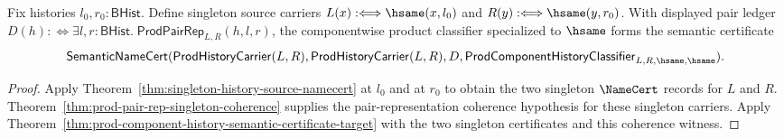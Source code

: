 \begin{theorem}
\label{thm:prod-singleton-componentwise-semantic-certificate}
Fix histories $l_0,r_0:\mathsf{BHist}$. Define singleton source carriers
$L(x):\Longleftrightarrow\hsame(x,l_0)$ and
$R(y):\Longleftrightarrow\hsame(y,r_0)$. With displayed pair ledger
$D(h):\Longleftrightarrow
\exists l,r:\mathsf{BHist}.\;\mathsf{ProdPairRep}_{L,R}(h,l,r)$, the
componentwise product classifier specialized to $\hsame$ forms the semantic
certificate
$$
\mathsf{SemanticNameCert}(\mathsf{ProdHistoryCarrier}(L,R),
\mathsf{ProdHistoryCarrier}(L,R),
D,
\mathsf{ProdComponentHistoryClassifier}_{L,R,\hsame,\hsame}).
$$
\end{theorem}
\begin{proof}
Apply Theorem~\ref{thm:singleton-history-source-namecert} at $l_0$ and at
$r_0$ to obtain the two singleton $\NameCert$ records for $L$ and $R$.
Theorem~\ref{thm:prod-pair-rep-singleton-coherence} supplies the
pair-representation coherence hypothesis for these singleton carriers. Apply
Theorem~\ref{thm:prod-component-history-semantic-certificate-target} with the
two singleton certificates and this coherence witness.
\end{proof}


